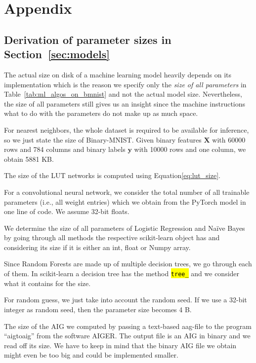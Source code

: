\appendix

\section{Appendix}

\subsection{Derivation of parameter sizes in Section~\ref{sec:models}} \label{app:size}
The actual size on disk of a machine learning model heavily depends on its implementation which is the reason we specify only the \textit{size of all parameters} in Table~\ref{tab:ml_algos_on_bmnist} and not the actual model size. Nevertheless, the size of all parameters still gives us an insight since the machine instructions what to do with the parameters do not make up as much space.

For nearest neighbors, the whole dataset is required to be available for inference, so we just state the size of Binary-MNIST. Given binary features $\bm{X}$ with 60000 rows and 784 columns and binary labels $\bm{y}$ with 10000 rows and one column, we obtain 5881 KB.

The size of the LUT networks is computed using Equation\ref{eq:lut_size}.

For a convolutional neural network, we consider the total number of all trainable parameters (i.e., all weight entries) which we obtain from the PyTorch model in one line of code. We assume 32-bit floats.

We determine the size of all parameters of Logistic Regression and Naïve Bayes by going through all methods the respective scikit-learn object has and considering its size if it is either an int, float or Numpy array.

Since Random Forests are made up of multiple decision trees, we go through each of them. In scikit-learn a decision tree has the method \hl{\texttt{tree\_}} and we consider what it contains for the size.

For random guess, we just take into account the random seed. If we use a 32-bit integer as random seed, then the parameter size becomes 4 B.

The size of the AIG we computed by passing a text-based aag-file to the program \enquote{aigtoaig} from the software AIGER. The output file is an AIG in binary and we read off its size. We have to keep in mind that the binary AIG file we obtain might even be too big and could be implemented smaller.

